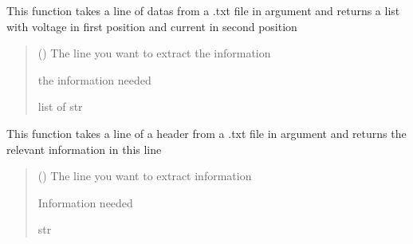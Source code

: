 \documentclass[letterpaper,10pt,english]{sphinxmanual}
\begin{document}
\begin{fulllineitems}
\label{\detokenize{split_data:split_data.dataSpliter}}
\pysigstartsignatures
{}
\pysigstopsignatures
\sphinxAtStartPar
This function takes a line of datas from a .txt file in argument and returns a list with voltage in first position and current in second position
\begin{quote}\begin{description}
\sphinxAtStartPar
{} () \textendash{} The line you want to extract the information

\sphinxAtStartPar
the information needed

\sphinxAtStartPar
list of str

\end{description}\end{quote}

\end{fulllineitems}


\begin{fulllineitems}
\label{\detokenize{split_data:split_data.spliter}}
\pysigstartsignatures
{}
\pysigstopsignatures
\sphinxAtStartPar
This function takes a line of a header from a .txt file in argument and returns the relevant information in this line
\begin{quote}\begin{description}
\sphinxAtStartPar
{} () \textendash{} The line you want to extract information

\sphinxAtStartPar
Information needed

\sphinxAtStartPar
str

\end{description}\end{quote}

\end{fulllineitems}
\end{document}
